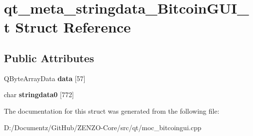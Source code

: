 \hypertarget{structqt__meta__stringdata___bitcoin_g_u_i__t}{}\section{qt\+\_\+meta\+\_\+stringdata\+\_\+\+Bitcoin\+G\+U\+I\+\_\+t Struct Reference}
\label{structqt__meta__stringdata___bitcoin_g_u_i__t}
\subsection*{Public Attributes}
\begin{DoxyCompactItemize}
\item 
\mbox{\label{structqt__meta__stringdata___bitcoin_g_u_i__t_aeec3fb0c96c1a875da9d04bbc3330500}} 
Q\+Byte\+Array\+Data {\bfseries data} \mbox{[}57\mbox{]}
\item 
\mbox{\label{structqt__meta__stringdata___bitcoin_g_u_i__t_a0860b24af55f52e3f5d5ae2d49d9e1ba}} 
char {\bfseries stringdata0} \mbox{[}772\mbox{]}
\end{DoxyCompactItemize}


The documentation for this struct was generated from the following file\+:\begin{DoxyCompactItemize}
\item 
D\+:/\+Documentz/\+Git\+Hub/\+Z\+E\+N\+Z\+O-\/\+Core/src/qt/moc\+\_\+bitcoingui.\+cpp\end{DoxyCompactItemize}

